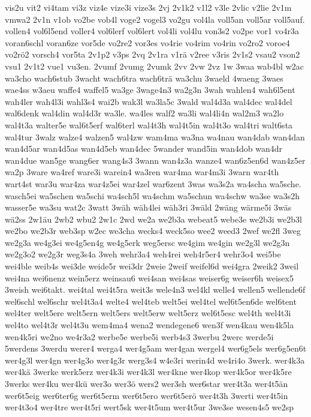 {vis2u
vit2
vi4tam
vi3z
viz4e
vize3i
vize3s
2vj
2v1k2
v1l2
v3le
2vlic
v2lie
2v1m
vmwa2
2v1n
v1ob
vo2be
vob4l
voge2
vogel3
vo2gu
vol4la
voll5an
voll5ar
voll5auf.
vollen4
vol6l5end
voller4
vol6lerf
vol6lert
vol4li
vol4lu
von3s2
vo2pe
vor1
vo4r3a
voran6schl
voran6ze
vor5de
vo2re2
vor3es
vo4rie
vo4rim
vo4rin
vo2ro2
voroe4
vo2rö2
vorsch4
vor5ta
2v1p2
v3ps
2vq
2v1ra
v1rä
v2ree
v3ris
2v1s2
vsau2
vson2
vsu1
2v1t2
vue1
vu3en.
2vumf
2vumg
2vumk
2vv
2vw
2vz
1w
3waa
wab4bl
w2ac
wa3cho
wach6stub
3wacht
wach6tra
wach6trä
wa3chu
3waeld
4waeng
3waes
wae4ss
w3aeu
waffe4
waffel5
wa3ge
3wage4n3
wa2g3n
3wah
wahlen4
wah6l5ent
wah4ler
wah4l3i
wahl3s4
wai2b
wak3l
wa3la5c
3wald
wal4d3a
wal4dec
wal4del
wal6denk
wal4din
wal4d3r
wa3le.
wa4les
walf2
wa3li
wal4li4n
wal2m3
wa2lo
wal4t3a
walter5e
wal6t5erf
wal6terl
wal4t3h
wal4t5in
wal4t3o
wal4tri
walt6sta
wal4tur
3walz
walze4
walzen5
wal4zw
wam4ma
wa3na
wa4nau
wan4dab
wan4dan
wan4d5ar
wan4d5as
wan4d5eb
wan4dec
5wander
wand5in
wan4dob
wan4dr
wan4due
wan5ge
wang6er
wang4s3
3wann
wan4z3a
wanze4
wan6z5en6d
wan4z5er
wa2p
3ware
wa4ref
ware3i
warein4
wa3ren
war4ma
war4m3i
3warn
war4th
wart4st
war3u
war4za
war4z5ei
war4zel
war6zent
3was
wa3s2a
wa4scha
wa5sche.
wasch5ei
wa5schen
wa5schi
wa4sch5l
wa4schm
wa5schun
wa4schw
wa3se
wa3s2h
wasser5e
wa3su
wat2c
3watt
3wäh
wäh4lei
wäh3ri
3wäld
2wäng
wärme5i
3wäs
wä2ss
2w1äu
2wb2
wbu2
2w1c
2wd
we2a
we2b3a
webeat5
webe3e
we2b3i
we2b3l
we2bo
we2b3r
web3sp
w2ec
we3cha
wecks4
weck5so
wee2
weed3
2wef
we2fl
3weg
we2g3a
we4g3ei
we4g5en4g
we4g5erk
weg5ersc
we4gim
we4gin
we2g3l
we2g3n
we2g3o2
we2g3r
weg3s4a
3weh
wehr3a4
weh4rei
weh4r5er4
wehr3o4
wei5be
wei4ble
weib4s
wei3de
weide5r
wei3dr
2weie
2weif
weifel6d
wei4gra
2weik2
3weil
wei4na
wei6nenz
wein5erz
weinsau6
wei4san
wei4sas
weiser6g
weiser6h
weisex5
3weish
wei6takt.
wei4tal
wei4t5ra
weit3s
wele4n3
wel4kl
welle4
wellen5
wellende6f
wel6schl
wel6schr
wel4t3a4
welte4
wel4teb
welt5ei
wel4tel
wel6t5en6de
wel6tent
wel4ter
welt5ere
welt5ern
welt5ers
welt5erw
welt5erz
wel6t5esc
wel4th
wel4t3i
wel4to
wel4t3r
wel4t3u
wem4ma4
wena2
wendegene6
wen3f
wen4kau
wen4k5la
wen4k5ri
we2no
we4r3a2
werbe5e
werbe5i
werb4s3
3werbu
2werc
werde5i
5werdens
3werdu
werer4
werga4
wer4g5am
wer4gan
wergel4
wer6g5els
wer6g5en6t
wer4g3l
wer4gn
wer4g3o
wer4g3r
werg3s4
w4e3ri
werin4d
we4ri4o
3werk.
wer4k3a
wer4kä
3werke
werk5erz
wer4k3i
wer4k3l
wer4kne
wer4kop
wer4k5or
wer4k5re
3werks
wer4ku
wer4kü
wer3o
wer3ö
wers2
wer3sh
wer6star
wer4t3a
wer4t5än
wer6t5eig
wer6ter6g
wer6t5erm
wer6t5ero
wer6t5erö
wer4t3h
3werti
wer4t5in
wer4t3o4
wer4tre
wer4t5ri
wert5sk
wer4t5um
wer4t5ur
3we3se
wesen4s5
we2sp
}
